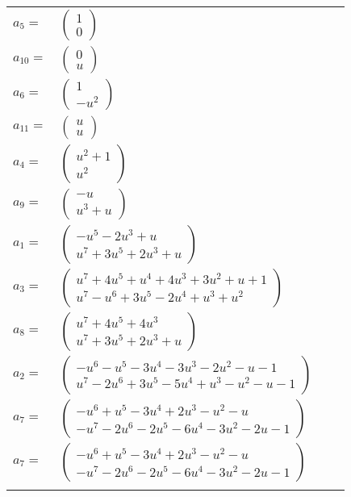 \documentclass[1p]{elsarticle_modified}
\theoremstyle{definition}
\begin{document}
\begin{tabular}{m{7pt} m{180pt} m{7pt} m{180pt} }
\flushright $a_{5}=$&$\begin{pmatrix}1\\0\end{pmatrix}$ \\
\flushright $a_{10}=$&$\begin{pmatrix}0\\u\end{pmatrix}$ \\
\flushright $a_{6}=$&$\begin{pmatrix}1\\- u^2\end{pmatrix}$ \\
\flushright $a_{11}=$&$\begin{pmatrix}u\\u\end{pmatrix}$ \\
\flushright $a_{4}=$&$\begin{pmatrix}u^2+1\\u^2\end{pmatrix}$ \\
\flushright $a_{9}=$&$\begin{pmatrix}- u\\u^3+u\end{pmatrix}$ \\
\flushright $a_{1}=$&$\begin{pmatrix}- u^5-2 u^3+u\\u^7+3 u^5+2 u^3+u\end{pmatrix}$ \\
\flushright $a_{3}=$&$\begin{pmatrix}u^7+4 u^5+u^4+4 u^3+3 u^2+u+1\\u^7- u^6+3 u^5-2 u^4+u^3+u^2\end{pmatrix}$ \\
\flushright $a_{8}=$&$\begin{pmatrix}u^7+4 u^5+4 u^3\\u^7+3 u^5+2 u^3+u\end{pmatrix}$ \\
\flushright $a_{2}=$&$\begin{pmatrix}- u^6- u^5-3 u^4-3 u^3-2 u^2- u-1\\u^7-2 u^6+3 u^5-5 u^4+u^3- u^2- u-1\end{pmatrix}$ \\
\flushright $a_{7}=$&$\begin{pmatrix}- u^6+u^5-3 u^4+2 u^3- u^2- u\\- u^7-2 u^6-2 u^5-6 u^4-3 u^2-2 u-1\end{pmatrix}$\\ \flushright $a_{7}=$&$\begin{pmatrix}- u^6+u^5-3 u^4+2 u^3- u^2- u\\- u^7-2 u^6-2 u^5-6 u^4-3 u^2-2 u-1\end{pmatrix}$\\&\end{tabular}
\end{document}
